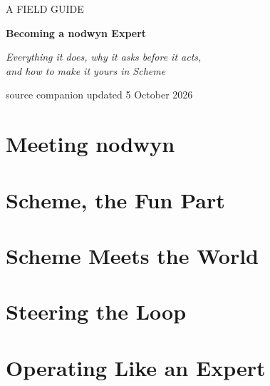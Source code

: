\documentclass[11pt,a4paper,oneside]{book}
\newcommand{\nodwyn}{\textsf{nodwyn}}
\begin{document}
\frontmatter
\begin{titlepage}
  \centering
  \vspace*{5cm}
  {\sffamily\color{moss}\large A FIELD GUIDE\par}
  \vspace{0.6cm}
  {\sffamily\bfseries\Huge Becoming a \nodwyn{} Expert\par}
  \vspace{0.6cm}
  {\large\itshape Everything it does, why it asks before it acts,\\ and how to make it yours in Scheme\par}
  \vfill
  {\sffamily\small source companion updated 5 October 2026\par}
\end{titlepage}


\tableofcontents

\mainmatter
\part{Meeting nodwyn}




\part{Scheme, the Fun Part}






\part{Scheme Meets the World}




\part{Steering the Loop}






\part{Operating Like an Expert}






\appendix



\end{document}

